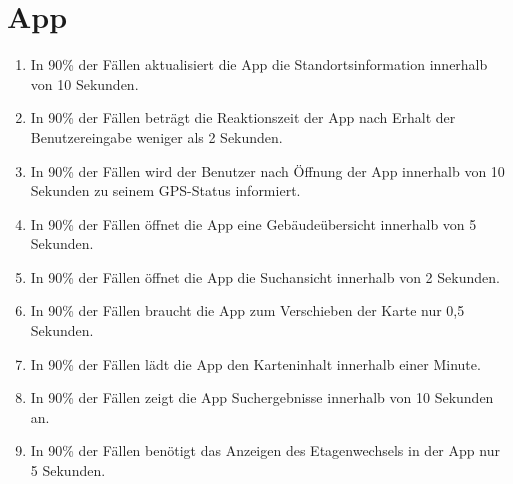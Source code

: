 \section{App}

\begin{enumerate}
    \item In 90\% der Fällen aktualisiert die App die Standortsinformation innerhalb von 10 Sekunden.
    \item In 90\% der Fällen beträgt die Reaktionszeit der App nach Erhalt der Benutzereingabe weniger als 2 Sekunden.
    \item In 90\% der Fällen wird der Benutzer nach Öffnung der App innerhalb von 10 Sekunden zu seinem GPS-Status informiert.
    \item In 90\% der Fällen öffnet die App eine Gebäudeübersicht innerhalb von 5 Sekunden.
    \item In 90\% der Fällen öffnet die App die Suchansicht innerhalb von 2 Sekunden.
    \item In 90\% der Fällen braucht die App zum Verschieben der Karte nur 0,5 Sekunden.
    \item In 90\% der Fällen lädt die App den Karteninhalt innerhalb einer Minute.
    \item In 90\% der Fällen zeigt die App Suchergebnisse innerhalb von 10 Sekunden an.
    \item In 90\% der Fällen benötigt das Anzeigen des Etagenwechsels in der App nur 5 Sekunden.
\end{enumerate}